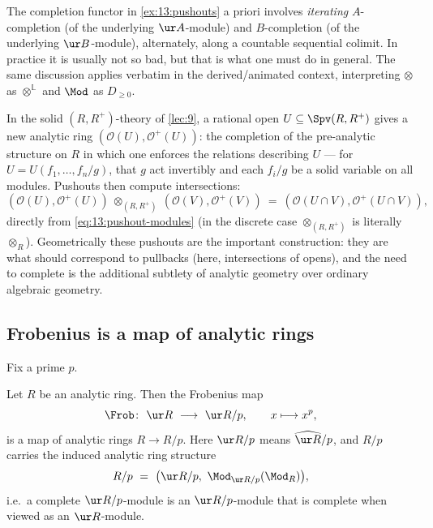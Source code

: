 \begin{remark}
\label{rmk:13:pushout-iteration}
The completion functor in \cref{ex:13:pushouts} a priori involves \emph{iterating}
$A$-completion (of the underlying $\ur A$-module) and $B$-completion (of the
underlying $\ur B$-module), alternately, along a countable sequential colimit. In
practice it is usually not so bad, but that is what one must do in general. The
same discussion applies verbatim in the derived/animated context, interpreting
$\otimes$ as $\otimes^{\mathbb L}$ and $\Mod$ as $D_{\ge 0}$.
\end{remark}

\begin{example}
\label{ex:13:rational-opens}
In the solid $(R,R^+)$-theory of \cref{lec:9}, a rational open $U\subseteq\Spv(R,R^+)$
gives a new analytic ring $(\mathcal O(U),\mathcal O^+(U))$: the completion of the
pre-analytic structure on $R$ in which one enforces the relations describing $U$
--- for $U=U(f_1,\dots,f_n/g)$, that $g$ act invertibly and each $f_i/g$ be a
solid variable on all modules. Pushouts then compute intersections:
\begin{equation*}
(\mathcal O(U),\mathcal O^+(U))\ \otimes_{(R,R^+)}\ (\mathcal O(V),\mathcal O^+(V))\ =\ (\mathcal O(U\cap V),\mathcal O^+(U\cap V)),
\end{equation*}
directly from \eqref{eq:13:pushout-modules} (in the discrete case
$\otimes_{(R,R^+)}$ is literally $\otimes_R$). Geometrically these pushouts are
the important construction: they are what should correspond to pullbacks (here,
intersections of opens), and the need to complete is the additional subtlety of
analytic geometry over ordinary algebraic geometry.
\end{example}

\subsection{Frobenius is a map of analytic rings}

Fix a prime $p$.

\begin{theorem}[Frobenius]
\label{thm:13:frobenius}
Let $R$ be an analytic ring. Then the Frobenius map
\begin{equation*}
\Frob\colon\ \ur R\ \longrightarrow\ \ur R/p,\qquad x\longmapsto x^p,
\end{equation*}
is a map of analytic rings $R\to R/p$. Here $\ur R/p$ means $\widehat{\ur R}/p$,
and $R/p$ carries the induced analytic ring structure
\begin{equation}
\label{eq:13:Rmodp}
R/p\ =\ \big(\ur R/p,\ \Mod_{\ur R/p}(\Mod_R)\big),
\end{equation}
i.e.\ a complete $\ur R/p$-module is an $\ur R/p$-module that is complete when
viewed as an $\ur R$-module.
\end{theorem}

